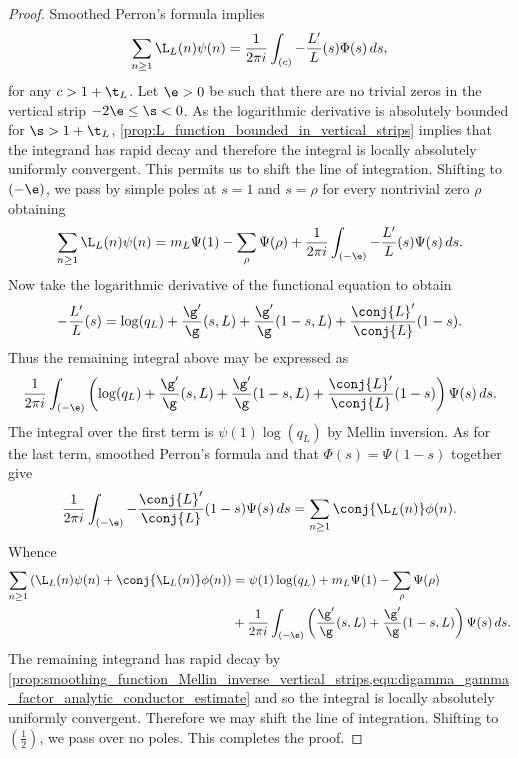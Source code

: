 \documentclass[12pt]{article}
\begin{document}
      \begin{proof}
        Smoothed Perron's formula implies
        \[
          \sum_{n \ge 1}\L_{L}(n)\psi(n) = \frac{1}{2\pi i}\int_{(c)}-\frac{L'}{L}(s)\Phi(s)\,ds,
        \]
        for any \(c > 1+\t_{L}\). Let \(\e > 0\) be such that there are no trivial zeros in the vertical strip \(-2\e \le \s < 0\). As the logarithmic derivative is absolutely bounded for \(\s > 1+\t_{L}\), \cref{prop:L_function_bounded_in_vertical_strips} implies that the integrand has rapid decay and therefore the integral is locally absolutely uniformly convergent. This permits us to shift the line of integration. Shifting to \((-\e)\), we pass by simple poles at \(s = 1\) and \(s = \rho\) for every nontrivial zero \(\rho\) obtaining
        \[
          \sum_{n \ge 1}\L_{L}(n)\psi(n) = m_{L}\Psi(1)-\sum_{\rho}\Psi(\rho)+\frac{1}{2\pi i}\int_{(-\e)}-\frac{L'}{L}(s)\Psi(s)\,ds.
        \]
        Now take the logarithmic derivative of the functional equation to obtain
        \[
          -\frac{L'}{L}(s) = \log(q_{L})+\frac{\g'}{\g}(s,L)+\frac{\g'}{\g}(1-s,L)+\frac{\conj{L}'}{\conj{L}}(1-s).
        \]
        Thus the remaining integral above may be expressed as
        \[
          \frac{1}{2\pi i}\int_{(-\e)}\left(\log(q_{L})+\frac{\g'}{\g}(s,L)+\frac{\g'}{\g}(1-s,L)+\frac{\conj{L}'}{\conj{L}}(1-s)\right)\Psi(s)\,ds.
        \]
        The integral over the first term is \(\psi(1)\log(q_{L})\) by Mellin inversion. As for the last term, smoothed Perron's formula and that \(\Phi(s) = \Psi(1-s)\) together give
        \[
          \frac{1}{2\pi i}\int_{(-\e)}-\frac{\conj{L}'}{\conj{L}}(1-s)\Psi(s)\,ds = \sum_{n \ge 1}\conj{\L_{L}(n)}\phi(n).
        \]
        Whence
        \begin{align*}
          \sum_{n \ge 1}\left(\L_{L}(n)\psi(n)+\conj{\L_{L}(n)}\phi(n)\right) &= \psi(1)\log(q_{L})+m_{L}\Psi(1)-\sum_{\rho}\Psi(\rho) \\
          &+ \frac{1}{2\pi i}\int_{(-\e)}\left(\frac{\g'}{\g}(s,L)+\frac{\g'}{\g}(1-s,L)\right)\Psi(s)\,ds.
        \end{align*}
        The remaining integrand has rapid decay by \cref{prop:smoothing_function_Mellin_inverse_vertical_strips,equ:digamma_gamma_factor_analytic_conductor_estimate} and so the integral is locally absolutely uniformly convergent. Therefore we may shift the line of integration. Shifting to \(\left(\frac{1}{2}\right)\), we pass over no poles. This completes the proof. 
      \end{proof}
\end{document}

